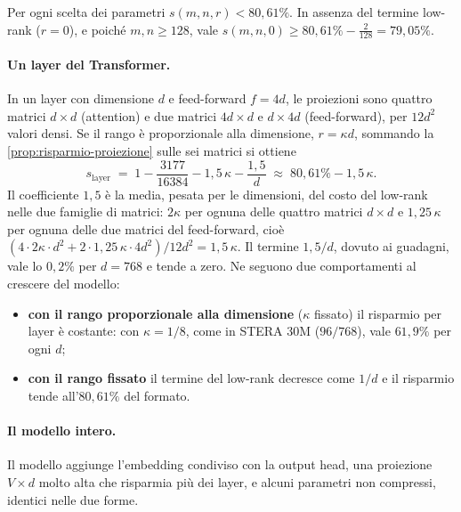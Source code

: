 \begin{osservazione}[Limiti]
Per ogni scelta dei parametri $s(m,n,r)<80{,}61\%$. In assenza del termine low-rank ($r=0$), e poiché $m,n\ge128$, vale $s(m,n,0)\ge 80{,}61\%-\tfrac{2}{128}=79{,}05\%$.
\end{osservazione}

\paragraph{Un layer del Transformer.} In un layer con dimensione $d$ e feed-forward $f=4d$, le proiezioni sono quattro matrici $d\times d$ (attention) e due matrici $4d\times d$ e $d\times 4d$ (feed-forward), per $12d^2$ valori densi. Se il rango è proporzionale alla dimensione, $r=\kappa d$, sommando la \autoref{prop:risparmio-proiezione} sulle sei matrici si ottiene
\[
s_{\text{layer}} \;=\; 1-\frac{3177}{16384} - 1{,}5\,\kappa - \frac{1{,}5}{d}
\;\approx\; 80{,}61\% - 1{,}5\,\kappa .
\]
Il coefficiente $1{,}5$ è la media, pesata per le dimensioni, del costo del low-rank nelle due famiglie di matrici: $2\kappa$ per ognuna delle quattro matrici $d\times d$ e $1{,}25\,\kappa$ per ognuna delle due matrici del feed-forward, cioè $(4\cdot 2\kappa\cdot d^2+2\cdot1{,}25\,\kappa\cdot4d^2)/12d^2=1{,}5\,\kappa$. Il termine $1{,}5/d$, dovuto ai guadagni, vale lo $0{,}2\%$ per $d=768$ e tende a zero. Ne seguono due comportamenti al crescere del modello:
\begin{itemize}
\item \textbf{con il rango proporzionale alla dimensione} ($\kappa$ fissato) il risparmio per layer è costante: con $\kappa=1/8$, come in STERA 30M ($96/768$), vale $61{,}9\%$ per ogni $d$;
\item \textbf{con il rango fissato} il termine del low-rank decresce come $1/d$ e il risparmio tende all'$80{,}61\%$ del formato.
\end{itemize}

\paragraph{Il modello intero.} Il modello aggiunge l'embedding condiviso con la output head, una proiezione $V\times d$ molto alta che risparmia più dei layer, e alcuni parametri non compressi, identici nelle due forme.

